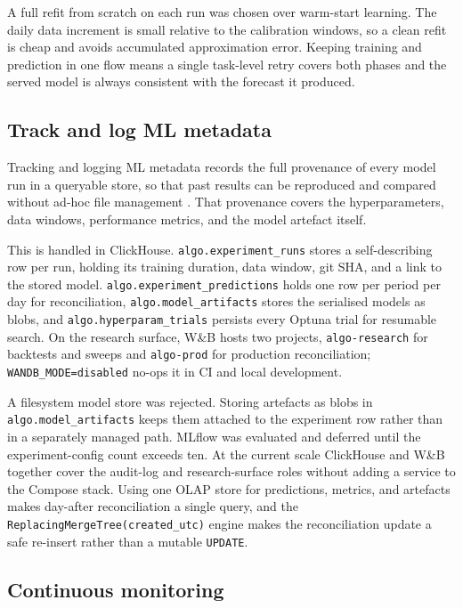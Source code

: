 A full refit from scratch on each run was chosen over warm-start learning. The
daily data increment is small relative to the calibration windows, so a clean
refit is cheap and avoids accumulated approximation error. Keeping training and
prediction in one flow means a single task-level retry covers both phases and
the served model is always consistent with the forecast it produced.

\subsection{Track and log ML metadata}

Tracking and logging ML metadata records the full provenance of every model run
in a queryable store, so that past results can be reproduced and compared
without ad-hoc file management \cite{zarour2025}. That
provenance covers the hyperparameters, data windows, performance metrics, and the
model artefact itself.

This is handled in ClickHouse. \texttt{algo.experiment\_runs} stores a
self-describing row per run, holding its training duration, data window, git SHA,
and a link to the stored model. \texttt{algo.experiment\_predictions} holds one row
per period per day for reconciliation, \texttt{algo.model\_artifacts} stores the
serialised models as blobs, and \texttt{algo.hyperparam\_trials} persists every
Optuna trial for resumable search. On the research surface, W\&B hosts two
projects, \texttt{algo-research} for backtests and sweeps and \texttt{algo-prod}
for production reconciliation; \texttt{WANDB\_MODE=disabled} no-ops it in CI and
local development.

A filesystem model store was rejected. Storing artefacts as blobs in
\texttt{algo.model\_\allowbreak artifacts} keeps them attached to the experiment row rather
than in a separately managed path. MLflow was evaluated and deferred until the
experiment-config count exceeds ten. At the current scale ClickHouse and W\&B
together cover the audit-log and research-surface roles without adding a service
to the Compose stack. Using one OLAP store for predictions, metrics, and
artefacts makes day-after reconciliation a single query, and the
\texttt{ReplacingMergeTree(created\_utc)} engine makes the reconciliation update
a safe re-insert rather than a mutable \texttt{UPDATE}.

\subsection{Continuous monitoring}

